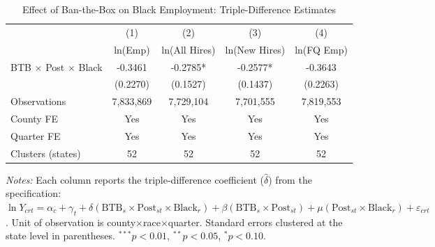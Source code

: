 \begin{table}[htbp]
\centering
\caption{Effect of Ban-the-Box on Black Employment: Triple-Difference Estimates}
\label{tab:main}
\begin{tabular}{lcccc}
\hline\hline
 & (1) & (2) & (3) & (4) \\
 & ln(Emp) & ln(All Hires) & ln(New Hires) & ln(FQ Emp) \\
\hline
BTB $\times$ Post $\times$ Black & -0.3461 & -0.2785* & -0.2577* & -0.3643 \\
 & (0.2270) & (0.1527) & (0.1437) & (0.2263) \\
\hline
Observations & 7,833,869 & 7,729,104 & 7,701,555 & 7,819,553 \\
County FE & Yes & Yes & Yes & Yes \\
Quarter FE & Yes & Yes & Yes & Yes \\
Clusters (states) & 52 & 52 & 52 & 52 \\
\hline\hline
\end{tabular}
\begin{tablenotes}[flushleft]\footnotesize
\item \textit{Notes:} Each column reports the triple-difference coefficient ($\hat{\delta}$) from the specification: $\ln Y_{crt} = \alpha_c + \gamma_t + \delta(\text{BTB}_s \times \text{Post}_{st} \times \text{Black}_r) + \beta(\text{BTB}_s \times \text{Post}_{st}) + \mu(\text{Post}_{st} \times \text{Black}_r) + \varepsilon_{crt}$. Unit of observation is county$\times$race$\times$quarter. Standard errors clustered at the state level in parentheses. $^{***}p<0.01$, $^{**}p<0.05$, $^{*}p<0.10$.
\end{tablenotes}
\end{table}

